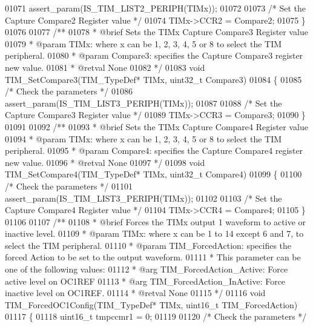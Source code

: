 \begin{DoxyCode}
01071   assert_param(IS\_TIM\_LIST2\_PERIPH(TIMx));
01072 
01073   \textcolor{comment}{/* Set the Capture Compare2 Register value */}
01074   TIMx->CCR2 = Compare2;
01075 \}
01076 
01077 \textcolor{comment}{/**}
01078 \textcolor{comment}{  * @brief  Sets the TIMx Capture Compare3 Register value}
01079 \textcolor{comment}{  * @param  TIMx: where x can be 1, 2, 3, 4, 5 or 8 to select the TIM peripheral.}
01080 \textcolor{comment}{  * @param  Compare3: specifies the Capture Compare3 register new value.}
01081 \textcolor{comment}{  * @retval None}
01082 \textcolor{comment}{  */}
01083 \textcolor{keywordtype}{void} TIM_SetCompare3(TIM\_TypeDef* TIMx, uint32\_t Compare3)
01084 \{
01085   \textcolor{comment}{/* Check the parameters */}
01086   assert_param(IS\_TIM\_LIST3\_PERIPH(TIMx));
01087 
01088   \textcolor{comment}{/* Set the Capture Compare3 Register value */}
01089   TIMx->CCR3 = Compare3;
01090 \}
01091 
01092 \textcolor{comment}{/**}
01093 \textcolor{comment}{  * @brief  Sets the TIMx Capture Compare4 Register value}
01094 \textcolor{comment}{  * @param  TIMx: where x can be 1, 2, 3, 4, 5 or 8 to select the TIM peripheral.}
01095 \textcolor{comment}{  * @param  Compare4: specifies the Capture Compare4 register new value.}
01096 \textcolor{comment}{  * @retval None}
01097 \textcolor{comment}{  */}
01098 \textcolor{keywordtype}{void} TIM_SetCompare4(TIM\_TypeDef* TIMx, uint32\_t Compare4)
01099 \{
01100   \textcolor{comment}{/* Check the parameters */}
01101   assert_param(IS\_TIM\_LIST3\_PERIPH(TIMx));
01102 
01103   \textcolor{comment}{/* Set the Capture Compare4 Register value */}
01104   TIMx->CCR4 = Compare4;
01105 \}
01106 
01107 \textcolor{comment}{/**}
01108 \textcolor{comment}{  * @brief  Forces the TIMx output 1 waveform to active or inactive level.}
01109 \textcolor{comment}{  * @param  TIMx: where x can be 1 to 14 except 6 and 7, to select the TIM peripheral.}
01110 \textcolor{comment}{  * @param  TIM\_ForcedAction: specifies the forced Action to be set to the output waveform.}
01111 \textcolor{comment}{  *          This parameter can be one of the following values:}
01112 \textcolor{comment}{  *            @arg TIM\_ForcedAction\_Active: Force active level on OC1REF}
01113 \textcolor{comment}{  *            @arg TIM\_ForcedAction\_InActive: Force inactive level on OC1REF.}
01114 \textcolor{comment}{  * @retval None}
01115 \textcolor{comment}{  */}
01116 \textcolor{keywordtype}{void} TIM_ForcedOC1Config(TIM\_TypeDef* TIMx, uint16\_t TIM\_ForcedAction)
01117 \{
01118   uint16\_t tmpccmr1 = 0;
01119 
01120   \textcolor{comment}{/* Check the parameters */}

\end{DoxyCode}
